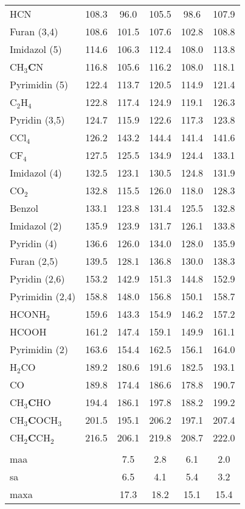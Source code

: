 \begin{table}[ht!]
{\begin{tabular}{lc|cc|cc}
    HCN   & 108.3 & 96.0  & 105.5 & 98.6  & 107.9 \\
    Furan (3,4) & 108.6 & 101.5 & 107.6 & 102.8 & 108.8 \\
    Imidazol (5) & 114.6 & 106.3 & 112.4 & 108.0 & 113.8 \\
    CH$_{3}$\textbf{C}N & 116.8 & 105.6 & 116.2 & 108.0 & 118.1 \\
    Pyrimidin (5) & 122.4 & 113.7 & 120.5 & 114.9 & 121.4 \\
    C$_{2}$H$_{4}$  & 122.8 & 117.4 & 124.9 & 119.1 & 126.3 \\
    Pyridin (3,5) & 124.7 & 115.9 & 122.6 & 117.3 & 123.8 \\
    CCl$_{4}$  & 126.2 & 143.2 & 144.4 & 141.4 & 141.6 \\
    CF$_{4}$   & 127.5 & 125.5 & 134.9 & 124.4 & 133.1 \\
    Imidazol (4) & 132.5 & 123.1 & 130.5 & 124.8 & 131.9 \\
    CO$_{2}$   & 132.8 & 115.5 & 126.0 & 118.0 & 128.3 \\
    Benzol & 133.1 & 123.8 & 131.4 & 125.5 & 132.8 \\
    Imidazol (2) & 135.9 & 123.9 & 131.7 & 126.1 & 133.8 \\
    Pyridin (4) & 136.6 & 126.0 & 134.0 & 128.0 & 135.9 \\
    Furan (2,5) & 139.5 & 128.1 & 136.8 & 130.0 & 138.3 \\
    Pyridin (2,6) & 153.2 & 142.9 & 151.3 & 144.8 & 152.9 \\
    Pyrimidin (2,4) & 158.8 & 148.0 & 156.8 & 150.1 & 158.7 \\
    HCONH$_{2}$ & 159.6 & 143.3 & 154.9 & 146.2 & 157.2 \\
    HCOOH & 161.2 & 147.4 & 159.1 & 149.9 & 161.1 \\
    Pyrimidin (2) & 163.6 & 154.4 & 162.5 & 156.1 & 164.0 \\
    H$_{2}$CO  & 189.2 & 180.6 & 191.6 & 182.5 & 193.1 \\
    CO    & 189.8 & 174.4 & 186.6 & 178.8 & 190.7 \\
    CH$_{3}$\textbf{C}HO & 194.4 & 186.1 & 197.8 & 188.2 & 199.2 \\
    CH$_{3}$\textbf{C}OCH$_{3}$ & 201.5 & 195.1 & 206.2 & 197.1 & 207.4 \\
    CH$_{2}$\textbf{C}CH$_{2}$ & 216.5 & 206.1 & 219.8 & 208.7 & 222.0 \\
          &       &       &       &       &  \\
    \ac{maa}   &       & 7.5   & 2.8   & 6.1   & 2.0 \\
    \ac{sa}   &       & 6.5   & 4.1   & 5.4   & 3.2 \\
    \ac{maxa}  &       & 17.3  & 18.2  & 15.1  & 15.4 \\
    \end{tabular}}%
  \label{tab:13cshifts}%
\end{table}%
\FloatBarrier


